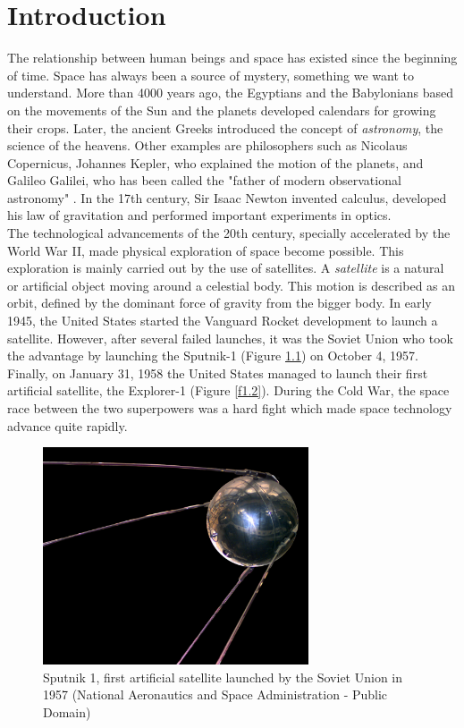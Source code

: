 \cleardoublepage
\setcounter{page}{1}

\chapter{Introduction} 
The relationship between human beings and space has existed since the beginning of time. Space has always been a source of mystery, something we want to understand. More than 4000 years ago, the Egyptians and the Babylonians based on the movements of the Sun and the planets developed calendars for growing their crops. Later, the ancient Greeks introduced the concept of \emph{astronomy}, the science of the heavens. Other examples are philosophers such as Nicolaus Copernicus, Johannes Kepler, who explained the motion of the planets, and Galileo Galilei, who has been called the "father of modern observational astronomy" \cite{Singer}. In the 17th century, Sir Isaac Newton invented calculus, developed his law of gravitation and performed important experiments in optics.\\

The technological advancements of the 20th century, specially accelerated by the World War II, made physical exploration of space become possible. This exploration is mainly carried out by the use of satellites. A \emph{satellite} is a natural or artificial object moving around a celestial body. This motion is described as an orbit, defined by the dominant force of gravity from the bigger body. In early 1945, the United States started the Vanguard Rocket development to launch a satellite. However, after several failed launches, it was the Soviet Union who took the advantage by launching the Sputnik-1 (Figure \ref{f1.1}) on October 4, 1957. Finally, on January 31, 1958 the United States managed to launch their first artificial satellite, the Explorer-1 (Figure \ref{f1.2}). During the Cold War, the space race between the two superpowers was a hard fight which made space technology advance quite rapidly.

\begin{figure}[H]
\centerline{\includegraphics[width=0.7\textwidth]{images/sputnik.jpg}}
\caption{Sputnik 1, first artificial satellite launched by the Soviet Union in 1957  (National Aeronautics and Space Administration - Public Domain)}
\label{f1.1}
\end{figure}


